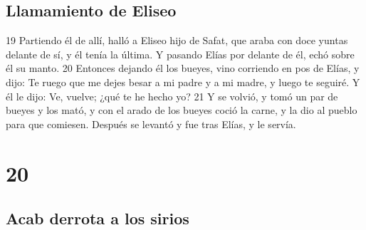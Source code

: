 \section*{Llamamiento de Eliseo}

19 Partiendo él de allí, halló a Eliseo hijo de Safat, que araba con doce yuntas delante de sí, y él tenía la última. Y pasando Elías por delante de él, echó sobre él su manto.
20 Entonces dejando él los bueyes, vino corriendo en pos de Elías, y dijo: Te ruego que me dejes besar a mi padre y a mi madre, y luego te seguiré. Y él le dijo: Ve, vuelve; ¿qué te he hecho yo?
21 Y se volvió, y tomó un par de bueyes y los mató, y con el arado de los bueyes coció la carne, y la dio al pueblo para que comiesen. Después se levantó y fue tras Elías, y le servía.

\chapter{20}

\section*{Acab derrota a los sirios }


